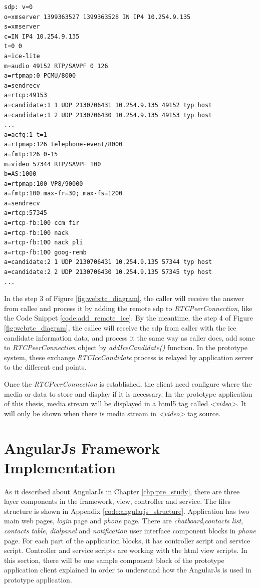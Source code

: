 \begin{lstlisting}[caption={Sample \gls{webrtc} Answer \gls{sdp}},label={log:webrtc_answer_sdp}]
sdp: v=0
o=xmserver 1399363527 1399363528 IN IP4 10.254.9.135
s=xmserver
c=IN IP4 10.254.9.135
t=0 0
a=ice-lite
m=audio 49152 RTP/SAVPF 0 126
a=rtpmap:0 PCMU/8000
a=sendrecv
a=rtcp:49153
a=candidate:1 1 UDP 2130706431 10.254.9.135 49152 typ host
a=candidate:1 2 UDP 2130706430 10.254.9.135 49153 typ host
...
a=acfg:1 t=1
a=rtpmap:126 telephone-event/8000
a=fmtp:126 0-15
m=video 57344 RTP/SAVPF 100
b=AS:1000
a=rtpmap:100 VP8/90000
a=fmtp:100 max-fr=30; max-fs=1200
a=sendrecv
a=rtcp:57345
a=rtcp-fb:100 ccm fir
a=rtcp-fb:100 nack
a=rtcp-fb:100 nack pli
a=rtcp-fb:100 goog-remb
a=candidate:2 1 UDP 2130706431 10.254.9.135 57344 typ host
a=candidate:2 2 UDP 2130706430 10.254.9.135 57345 typ host
...
\end{lstlisting}

\par In the step 3 of Figure \ref{fig:webrtc_diagram}, the caller will receive the answer from callee and process it by adding the remote \gls{sdp} to \textit{RTCPeerConnection}, like the Code Snippet \ref{code:add_remote_ice}. By the meantime, the step 4 of Figure \ref{fig:webrtc_diagram}, the callee will receive the \gls{sdp} from caller with the \gls{ice} candidate information data, and process it the same way as caller does, add some to \textit{RTCPeerConnection} object by \textit{addIceCandidate()} function. In the prototype system, these exchange \textit{RTCIceCandidate} process is relayed by application server to the different end points.

\par Once the \textit{RTCPeerConnection} is established, the client need configure where the media or data to store and display if it is necessary. In the prototype application of this thesis, media stream will be displayed in a \gls{html5} tag called \textit{<video>}. It will only be shown when there is media stream in \textit{<video>} tag source.

\section{AngularJs Framework Implementation}

\noindent As it described about AngularJs in Chapter \ref{chp:pre_study}, there are three layer components in the framework, view, controller and service. The files structure is shown in Appendix \ref{code:angularjs_structure}. Application has two main web pages, \textit{login} page and \textit{phone} page. There are \textit{chatboard},\textit{contacts list}, \textit{contacts table}, \textit{dialpanel} and \textit{notification} user interface component blocks in \textit{phone} page. For each part of the application blocks, it has controller script and service script. Controller and service scripts are working with the \gls{html} view scripts. In this section, there will be one sample component block of the prototype application client explained in order to understand how the AngularJs is used in prototype application.

